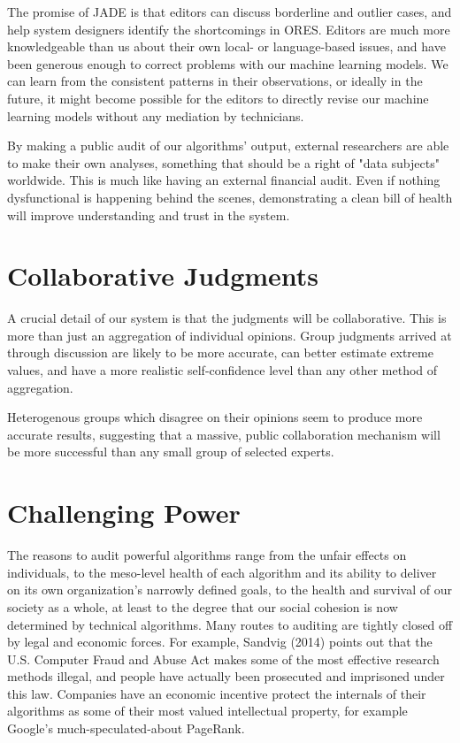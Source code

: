 \documentclass{sigchi-ext}
\begin{document}
The promise of JADE is that editors can discuss borderline and outlier cases, and help system designers identify the shortcomings in ORES.  Editors are much more knowledgeable than us about their own local- or language-based issues, and have been generous enough to correct problems with our machine learning models.  We can learn from the consistent patterns in their observations, or ideally in the future, it might become possible for the editors to directly revise our machine learning models without any mediation by technicians.

By making a public audit of our algorithms' output, external researchers are able to make their own analyses, something that should be a right of "data subjects" worldwide.  This is much like having an external financial audit.  Even if nothing dysfunctional is happening behind the scenes, demonstrating a clean bill of health will improve understanding and trust in the system.\cite{sandvig2014auditing}

\section{Collaborative Judgments}

A crucial detail of our system is that the judgments will be collaborative.  This is more than just an aggregation of individual opinions.  Group judgments arrived at through discussion are likely to be more accurate, can better estimate extreme values, and have a more realistic self-confidence level than any other method of aggregation.\cite{sniezek1989accuracy}

Heterogenous groups which disagree on their opinions seem to produce more accurate results, suggesting that a massive, public collaboration mechanism will be more successful than any small group of selected experts.\cite{schulz2006group}

\section{Challenging Power}

The reasons to audit powerful algorithms range from the unfair effects on individuals, to the meso-level health of each algorithm and its ability to deliver on its own organization's narrowly defined goals, to the health and survival of our society as a whole, at least to the degree that our social cohesion is now determined by technical algorithms.  Many routes to auditing are tightly closed off by legal and economic forces.  For example, Sandvig (2014) points out that the U.S. Computer Fraud and Abuse Act makes some of the most effective research methods illegal, and people have actually been prosecuted and imprisoned under this law.  Companies have an economic incentive protect the internals of their algorithms as some of their most valued intellectual property, for example Google's much-speculated-about PageRank.
\end{document}
